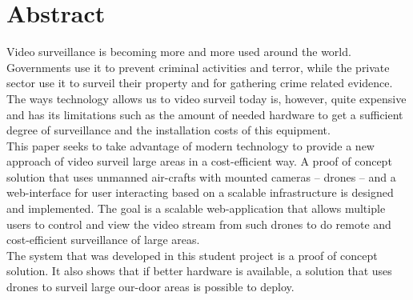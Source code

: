 \begingroup
\let\clearpage\relax
\let\cleardoublepage\relax
\let\cleardoublepage\relax

\chapter*{Abstract}
Video surveillance is becoming more and more used around the world.
Governments use it to prevent criminal activities and terror, while the private sector use it to surveil their property and for gathering crime related evidence.
The ways technology allows us to video surveil today is, however, quite expensive and has its limitations such as the amount of needed hardware to get a sufficient degree of surveillance and the installation costs of this equipment. \\

This paper seeks to take advantage of modern technology to provide a new approach of video surveil large areas in a cost-efficient way. 
A proof of concept solution that uses unmanned air-crafts with mounted cameras -- drones -- and a web-interface for user interacting based on a scalable infrastructure is designed and implemented.
The goal is a scalable web-application that allows multiple users to control and view the video stream from such drones to do remote and cost-efficient surveillance of large areas. \\

The system that was developed in this student project is a proof of concept solution.
It also shows that if better hardware is available, a solution that uses drones to surveil large our-door areas is possible to deploy.

\endgroup			

\vfill